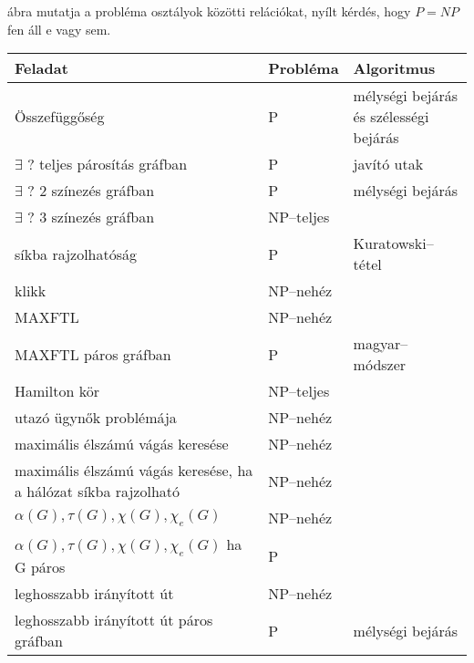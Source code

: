  ábra mutatja a probléma osztályok közötti relációkat, nyílt
kérdés, hogy $P=NP$ fen áll e vagy sem.

\begin{table}
	\begin{tabular}{|m{6.5cm}|m{2cm}|m{3.5cm}|}
		\hline
		Feladat                                                         & Probléma   & Algoritmus                             \\
		\hline\arrayrulecolor{lightgray}
		Összefüggőség                                                   & P          & mélységi bejárás és szélességi bejárás \\  \hline
		$\exists$ ? teljes párosítás gráfban                            & P          & javító utak                            \\\hline
		$\exists$ ? $2$ színezés gráfban                                & P          & mélységi bejárás                       \\\hline
		$\exists$ ? $3$ színezés gráfban                                & NP--teljes &                                        \\\hline
		síkba rajzolhatóság                                             & P          & Kuratowski--tétel                      \\\hline
		klikk                                                           & NP--nehéz  &                                        \\\hline
		MAXFTL                                                          & NP--nehéz  &                                        \\\hline
		MAXFTL páros gráfban                                            & P          & magyar--módszer                        \\\hline
		Hamilton kör                                                    & NP--teljes &                                        \\\hline
		utazó ügynők problémája                                         & NP--nehéz  &                                        \\\hline
		maximális élszámú vágás keresése                                & NP--nehéz  &                                        \\\hline
		maximális élszámú vágás keresése, ha a hálózat síkba rajzolható & NP--nehéz  &                                        \\\hline
		$\alpha(G), \tau(G), \chi(G), \chi_e(G)$                        & NP--nehéz  &                                        \\\hline
		$\alpha(G), \tau(G), \chi(G), \chi_e(G)$ ha G páros             & P          &                                        \\\hline
		leghosszabb irányított út                                       & NP--nehéz  &                                        \\\hline
		leghosszabb irányított út páros gráfban                         & P          & mélységi bejárás                       \\
		\hline
	\end{tabular}
\end{table}

